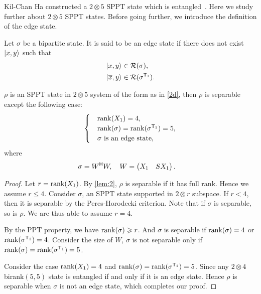   Kil-Chan Ha  constructed a  $2\otimes 5$ SPPT state which is entangled~\cite{Ha2012}. Here we study further about
  $2\otimes 5$ SPPT states. Before going further, we  introduce the  definition of the edge state.
  \begin{defi}
    Let  $\sigma$ be a bipartite state. It is said to be an edge state if there does not exist $\ket{x,y}$ such that
  \begin{equation}
    \label{multiSPPTv0.6:eq:11}
    \begin{split}
    \ket{x,y} &\in \mathcal{R} (\sigma),\\
    \ket{\overline{x} ,y}&\in \mathcal{R} (\sigma^{\mathsf{T}_1}).
    \end{split}
  \end{equation}
  \end{defi}
  
  \begin{thm}
    $\rho$ is an SPPT state in $2\otimes 5$ system of the form as in \cref{2d}, then $\rho$ is separable except the following case:
    \begin{equation}
      \label{eq:53}
      \begin{cases}
         &\mathrm{rank} (X_1)=4,\\
          &\mathrm{rank} (\sigma) =\mathrm{rank} (\sigma^{\mathsf{T}_1}) =5,\\
          &\sigma \text{ is an edge state},
      \end{cases}
    \end{equation}
    where
    \begin{equation*}
      \begin{split}
        \sigma & = W^{\mathsf{H}}W,\quad
        W  =
        \begin{pmatrix}
          X_1 & SX_1\\
        \end{pmatrix}.
      \end{split}
    \end{equation*}
  \end{thm}
 
  \begin{proof}
    Let $r = \mathrm{rank} (X_1)$. By \cref{lem:2}, $\rho$ is separable if it has full rank. Hence  we assume  $r\leqslant 4$.
    Consider $\sigma$,  an SPPT state  supported in $2\otimes r$ subspace. If $r<4$, then it is separable by
    the Peres-Horodecki criterion. Note that  if $\sigma$ is separable, so is $\rho$. We  are thus able to  assume $r=4$.


    By the PPT property, we have $\mathrm{rank} (\sigma)\geqslant r$. And $\sigma$ is separable if $\mathrm{rank} (\sigma) = 4$ or
    $\mathrm{rank} (\sigma^{\mathsf{T}_1})=4$. Consider the size of $W$, $\sigma$ is not separable only if
    $\mathrm{rank} (\sigma)=\mathrm{rank} (\sigma^{\mathsf{T}_1})=5$. 

    Consider the case $\mathrm{rank} (X_1)=4$ and  $\mathrm{rank} (\sigma)=\mathrm{rank} (\sigma^{\mathsf{T}_1})=5$. Since any $2\otimes 4$ birank$(5,5)$ state is entangled if and only if it is an edge state. Hence $\rho$ is separable
    when $\sigma$ is not an edge state, which completes our proof.
  \end{proof}

